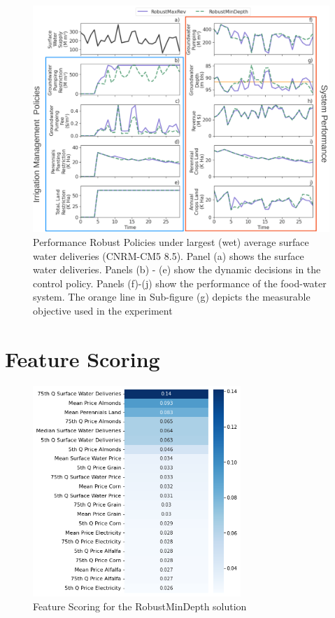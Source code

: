 \documentclass[11pt,a4paper]{article}
\begin{document}
\begin{figure}[H]
    \centering
    \includegraphics[width=1\textwidth]{./figs/robust_wet_performance.png}
    \caption{Performance Robust Policies under largest (wet) average surface water deliveries (CNRM-CM5 8.5). Panel (a) shows the surface water deliveries. Panels (b) - (e) show the dynamic decisions in the control policy. Panels (f)-(j) show the performance of the food-water system. The orange line in Sub-figure (g) depicts the measurable objective used in the experiment}
    \label{fig:m1esh1}
\end{figure}

\section{Feature Scoring}

\begin{figure}[H]
    \centering
    \includegraphics[width=0.7\textwidth]{./figs/prim_robust_mindepth_rank.png}
    \caption{Feature Scoring for the RobustMinDepth solution}
    \label{fig:m1esh1}
\end{figure}
\end{document}

